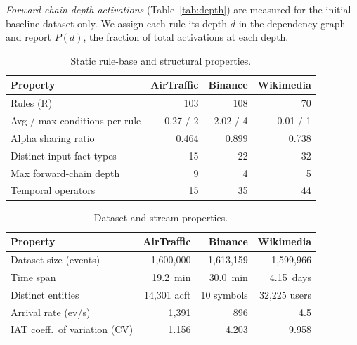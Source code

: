 \emph{Forward-chain depth activations} (Table~\ref{tab:depth}) are measured for the initial baseline dataset only. We assign each rule its depth $d$ in the dependency graph and report $P(d)$, the fraction of total activations at each depth.

\begin{table}[t]
\centering
\caption{Static rule-base and structural properties.}\label{tab:static}
\small
\begin{tabular}{@{}lrrr@{}}
\toprule
\textbf{Property} & \textbf{AirTraffic} & \textbf{Binance} & \textbf{Wikimedia} \\
\midrule
Rules (R)                       & 103      & 108      & 70      \\
Avg / max conditions per rule   & 0.27 / 2 & 2.02 / 4 & 0.01 / 1 \\
Alpha sharing ratio             & 0.464    & 0.899    & 0.738   \\
Distinct input fact types       & 15       & 22       & 32      \\
Max forward-chain depth         & 9        & 4        & 5       \\
Temporal operators              & 15       & 35       & 44      \\
\bottomrule
\end{tabular}
\end{table}

\begin{table}[t]
\centering
\caption{Dataset and stream properties.}\label{tab:stream}
\small
\begin{tabular}{@{}lrrr@{}}
\toprule
\textbf{Property} & \textbf{AirTraffic} & \textbf{Binance} & \textbf{Wikimedia} \\
\midrule
Dataset size (events)         & 1,600,000   & 1,613,159   & 1,599,966   \\
Time span                     & 19.2~min    & 30.0~min    & 4.15~days   \\
Distinct entities             & 14,301 acft & 10 symbols  & 32,225 users \\
Arrival rate (ev/s)           & 1,391       & 896         & 4.5         \\
IAT coeff.\ of variation (CV) & 1.156       & 4.203       & 9.958       \\
\bottomrule
\end{tabular}
\end{table}

